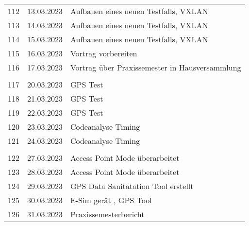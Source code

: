 \begin{longtable}{|l|c|l|}
&               &                                                       \\ \hline 
112 & 13.03.2023    & Aufbauen eines neuen Testfalls, VXLAN                                                      \\ \hline
113 & 14.03.2023    & Aufbauen eines neuen Testfalls, VXLAN                                                          \\ \hline
114 & 15.03.2023    &  Aufbauen eines neuen Testfalls, VXLAN                                                         \\ \hline
115 & 16.03.2023    &  Vortrag vorbereiten                                                     \\ \hline
116 & 17.03.2023    &  Vortrag über Praxissemester in Hausversammlung                                                     \\ \hline
&               &                                                       \\ \hline 
117 & 20.03.2023    &  GPS Test                                                     \\ \hline
118 & 21.03.2023    &  GPS Test                                                     \\ \hline
119 & 22.03.2023    &  GPS Test                                                     \\ \hline
120 & 23.03.2023    &  Codeanalyse Timing                                                    \\ \hline
121 & 24.03.2023    &  Codeanalyse Timing                                                     \\ \hline
&               &                                                       \\ \hline 
122 & 27.03.2023    &  Access Point Mode überarbeitet                                                     \\ \hline
123 & 28.03.2023    &  Access Point Mode überarbeitet                                                      \\ \hline
124 & 29.03.2023    &  GPS Data Sanitatation Tool erstellt                                                  \\ \hline
125 & 30.03.2023    &  E-Sim gerät \q{ausgetauscht}, GPS Tool                                                    \\ \hline
126 & 31.03.2023    &  Praxissemesterbericht                                                    \\ \hline












\end{longtable}